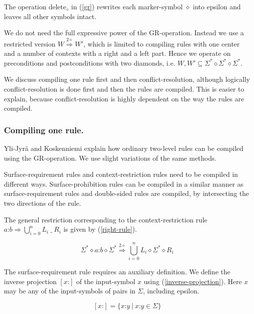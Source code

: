 \documentclass[postprint]{flammie}
\begin{document}
The operation $\text{delete}_\diamond$ in (\ref{gr}) rewrites each
marker-symbol $\diamond$ into epsilon and leaves all other symbols
intact.

We do not need the full expressive power of the GR-operation. Instead
we use a restricted version $W \overset{2\diamond}{\Rightarrow}W'$,
which is limited to compiling rules with one center and a number of
contexts with a right and a left part. Hence we operate on
preconditions and postconditions with two diamonds,
i.e. $W,W'\subseteq \Sigma^* \diamond \Sigma^* \diamond \Sigma^*$.

We discuss compiling one rule first and then conflict-resolution,
although logically conflict-resolution is done first and then the
rules are compiled. This is easier to explain, because
conflict-resolution is highly dependent on the way the rules are
compiled.

\subsubsection{Compiling one rule.}
\label{twolc-rules}
Yli-Jyr\"a and Koskenniemi \cite{Yli-Jyra06} explain how ordinary
two-level rules can be compiled using the GR-operation. We use slight
variations of the same methods.

Surface-requirement rules and context-restriction rules need to be
compiled in different ways. Surface-prohibition rules can be compiled
in a similar manner as surface-requirement rules and double-sided
rules are compiled, by intersecting the two directions of the rule.

The general restriction corresponding to the context-restriction rule
$a\text{:}b \Rightarrow \bigcup_{i=0}^n L_i\ \_\ R_i$ is given by
(\ref{right-rule}).

\begin{equation}
  \label{right-rule}
  \Sigma^* \diamond a\text{:}b\diamond\Sigma^*
  \overset{2\diamond}{\Rightarrow} \bigcup_{i=0}^n
  L_i\diamond\Sigma^*\diamond R_i
\end{equation}

The surface-requirement rule requires an auxiliary definition. We
define the inverse projection $[x\text{:}]$ of the input-symbol $x$
using (\ref{inverse-projection}). Here $x$ may be any of the
input-symbols of pairs in $\Sigma$, including epsilon.

\begin{equation}
  \label{inverse-projection}
	[x\text{:}] = \{ x\text{:}y\ |\ x\text{:}y \in \Sigma \}
\end{equation}
\end{document}
